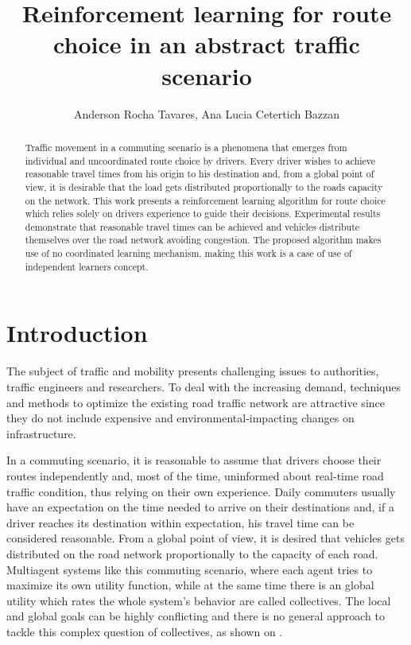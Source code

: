 \documentclass[12pt]{article}
\title{Reinforcement learning for route choice in an abstract traffic scenario}
\author{
  Anderson Rocha Tavares\inst{1}, Ana Lucia Cetertich Bazzan\inst{1}
}
\begin{document}
\maketitle

\begin{abstract}
Traffic movement in a commuting scenario is a phenomena that emerges from individual and uncoordinated route choice by drivers. Every driver wishes to achieve reasonable travel times from his origin to his destination and, from a global point of view, it is desirable that the load gets distributed proportionally to the roads capacity on the network. This work presents a reinforcement learning algorithm for route choice which relies solely on drivers experience to guide their decisions. Experimental results demonstrate that reasonable travel times can be achieved and vehicles distribute themselves over the road network avoiding congestion. The proposed algorithm makes use of no coordinated learning mechanism, making this work is a case of use of independent learners concept.
\end{abstract}





\section{Introduction}
\label{sec:intro}

The subject of traffic and mobility presents challenging issues to authorities, traffic engineers and researchers. To deal with the increasing demand, techniques and methods to optimize the existing road traffic network are attractive since they do not include expensive and environmental-impacting changes on infrastructure.

In a commuting scenario, it is reasonable to assume that drivers choose their routes independently and, most of the time, uninformed about real-time road traffic condition, thus relying on their own experience. Daily commuters usually have an expectation on the time needed to arrive on their destinations and, if a driver reaches its destination within expectation, his travel time can be considered  reasonable. From a global point of view, it is desired that vehicles gets distributed on the road network proportionally to the capacity of each road. Multiagent systems like this commuting scenario, where each agent tries to maximize its own utility function, while at the same time there is an global utility which rates the whole system's behavior are called collectives. The local and global goals can be highly conflicting and there is no general approach to tackle this complex question of collectives, as shown on \cite{Tumer&Wolpert2004}.
\end{document}
